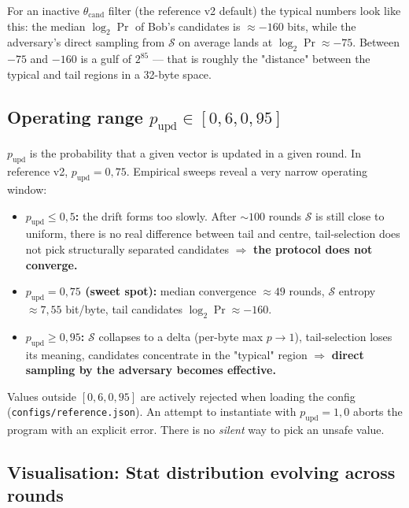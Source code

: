 \documentclass[11pt,a4paper]{article}
\begin{document}
For an inactive $\theta_\text{cand}$ filter (the reference v2 default) the typical numbers look like this: the median $\log_2 \Pr$ of Bob's candidates is $\approx -160$ bits, while the adversary's direct sampling from $\mathcal{S}$ on average lands at $\log_2 \Pr \approx -75$. Between $-75$ and $-160$ is a gulf of $2^{85}$ --- that is roughly the "distance" between the typical and tail regions in a 32-byte space.

\subsection{Operating range \texorpdfstring{$p_\text{upd} \in [0{,}6, 0{,}95]$}{p\_upd in [0.6, 0.95]}}

$p_\text{upd}$ is the probability that a given vector is updated in a given round. In reference v2, $p_\text{upd} = 0{,}75$. Empirical sweeps reveal a very narrow operating window:

\begin{itemize}[leftmargin=*]
\item \textbf{$p_\text{upd} \leq 0{,}5$:} the drift forms too slowly. After $\sim 100$ rounds $\mathcal{S}$ is still close to uniform, there is no real difference between tail and centre, tail-selection does not pick structurally separated candidates $\Rightarrow$ \textbf{the protocol does not converge.}
\item \textbf{$p_\text{upd} = 0{,}75$ (sweet spot):} median convergence $\approx 49$ rounds, $\mathcal{S}$ entropy $\approx 7{,}55$ bit/byte, tail candidates $\log_2 \Pr \approx -160$.
\item \textbf{$p_\text{upd} \geq 0{,}95$:} $\mathcal{S}$ collapses to a delta (per-byte max $p \to 1$), tail-selection loses its meaning, candidates concentrate in the "typical" region $\Rightarrow$ \textbf{direct sampling by the adversary becomes effective.}
\end{itemize}

\begin{warning}
Values outside $[0{,}6, 0{,}95]$ are actively rejected when loading the config (\texttt{configs/reference.json}). An attempt to instantiate with $p_\text{upd} = 1{,}0$ aborts the program with an explicit error. There is no \emph{silent} way to pick an unsafe value.
\end{warning}

\subsection{Visualisation: Stat distribution evolving across rounds}
\end{document}
